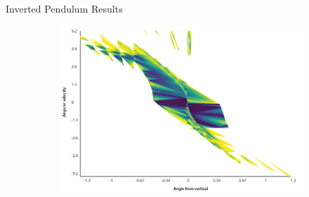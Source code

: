 \documentclass{beamer}
\begin{document}
\begin{frame}{Inverted Pendulum Results}
  \begin{figure}[t]
      \centering
      
      \begin{subfigure}{0.9\linewidth}
          \centering
          \includegraphics[width=0.95\linewidth,trim=0 0 0 0,clip]{assets/lyapunov}
      \end{subfigure}
      \begin{subfigure}{0.08\linewidth}
          \centering

\end{subfigure}
\end{figure}
\end{frame}
\end{document}
